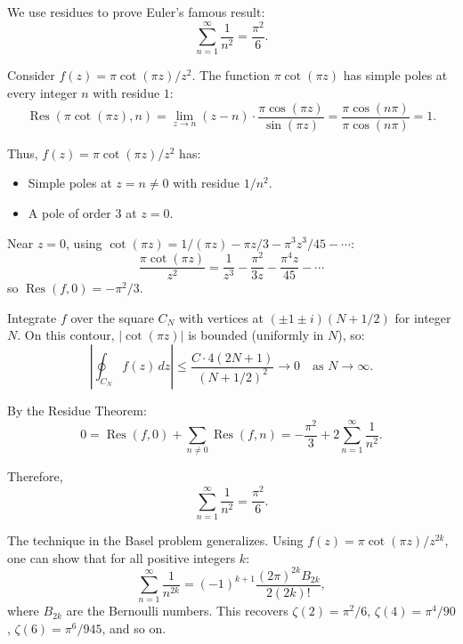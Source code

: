 \begin{example}
  We use residues to prove Euler's famous result:
  \[
    \sum_{n=1}^{\infty} \frac{1}{n^2} = \frac{\pi^2}{6}.
  \]

  Consider $f(z) = \pi \cot(\pi z) / z^2$. The function $\pi \cot(\pi z)$ has simple poles at every integer $n$ with residue $1$:
  \[
    \operatorname{Res}(\pi \cot(\pi z), n) = \lim_{z \to n} (z - n) \cdot \frac{\pi \cos(\pi z)}{\sin(\pi z)} = \frac{\pi \cos(n\pi)}{\pi \cos(n\pi)} = 1.
  \]

  Thus, $f(z) = \pi \cot(\pi z)/z^2$ has:
  \begin{itemize}
    \item Simple poles at $z = n \neq 0$ with residue $1/n^2$.
    \item A pole of order $3$ at $z = 0$.
  \end{itemize}

  Near $z = 0$, using $\cot(\pi z) = 1/(\pi z) - \pi z/3 - \pi^3 z^3/45 - \cdots$:
  \[
    \frac{\pi \cot(\pi z)}{z^2} = \frac{1}{z^3} - \frac{\pi^2}{3z} - \frac{\pi^4 z}{45} - \cdots
  \]
  so $\operatorname{Res}(f, 0) = -\pi^2/3$.

  Integrate $f$ over the square $C_N$ with vertices at $(\pm 1 \pm i)(N + 1/2)$ for integer $N$.
  On this contour, $|\cot(\pi z)|$ is bounded (uniformly in $N$), so:
  \[
    \left| \oint_{C_N} f(z) \, dz \right| \leq \frac{C \cdot 4(2N+1)}{(N + 1/2)^2} \to 0 \quad \text{as } N \to \infty.
  \]

  By the Residue Theorem:
  \[
    0 = \operatorname{Res}(f, 0) + \sum_{n \neq 0} \operatorname{Res}(f, n) = -\frac{\pi^2}{3} + 2\sum_{n=1}^{\infty} \frac{1}{n^2}.
  \]

  Therefore,
  \[
    \boxed{\sum_{n=1}^{\infty} \frac{1}{n^2} = \frac{\pi^2}{6}.}
  \]
\end{example}

\begin{remark}
  The technique in the Basel problem generalizes. Using $f(z) = \pi \cot(\pi z)/z^{2k}$, one can show that for all positive integers $k$:
  \[
    \sum_{n=1}^{\infty} \frac{1}{n^{2k}} = (-1)^{k+1} \frac{(2\pi)^{2k} B_{2k}}{2 (2k)!},
  \]
  where $B_{2k}$ are the Bernoulli numbers. This recovers $\zeta(2) = \pi^2/6$, $\zeta(4) = \pi^4/90$, $\zeta(6) = \pi^6/945$, and so on.
\end{remark}


